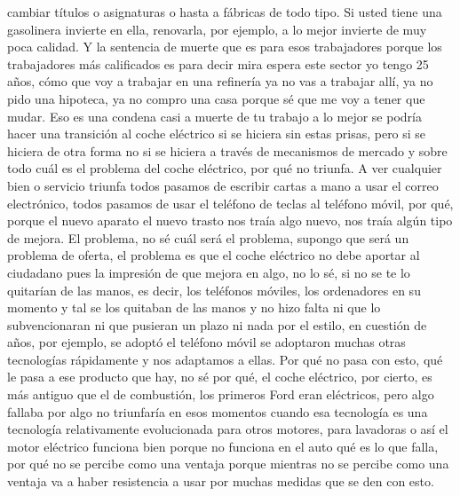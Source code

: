 cambiar títulos o asignaturas o hasta a fábricas de todo tipo. Si usted tiene una gasolinera invierte en ella, renovarla, por ejemplo, a lo mejor invierte de muy poca calidad. Y la sentencia de muerte que es para esos trabajadores porque los trabajadores más calificados es para decir mira espera este sector yo tengo 25 años, cómo que voy a trabajar en una refinería ya no vas a trabajar allí, ya no pido una hipoteca, ya no compro una casa porque sé que me voy a tener que mudar. Eso es una condena casi a muerte de tu trabajo a lo mejor se podría hacer una transición al coche eléctrico si se hiciera sin estas prisas, pero si se hiciera de otra forma no si se hiciera a través de mecanismos de mercado y sobre todo cuál es el problema del coche eléctrico, por qué no triunfa. A ver cualquier bien o servicio triunfa todos pasamos de escribir cartas a mano a usar el correo electrónico, todos pasamos de usar el teléfono de teclas al teléfono móvil, por qué, porque el nuevo aparato el nuevo trasto nos traía algo nuevo, nos traía algún tipo de mejora. El problema, no sé cuál será el problema, supongo que será un problema de oferta, el problema es que el coche eléctrico no debe aportar al ciudadano pues la impresión de que mejora en algo, no lo sé, si no se te lo quitarían de las manos, es decir, los teléfonos móviles, los ordenadores en su momento y tal se los quitaban de las manos y no hizo falta ni que lo subvencionaran ni que pusieran un plazo ni nada por el estilo, en cuestión de años, por ejemplo, se adoptó el teléfono móvil se adoptaron muchas otras tecnologías rápidamente y nos adaptamos a ellas. Por qué no pasa con esto, qué le pasa a ese producto que hay, no sé por qué, el coche eléctrico, por cierto, es más antiguo que el de combustión, los primeros Ford eran eléctricos, pero algo fallaba por algo no triunfaría en esos momentos cuando esa tecnología es una tecnología relativamente evolucionada para otros motores, para lavadoras o así el motor eléctrico funciona bien porque no funciona en el auto qué es lo que falla, por qué no se percibe como una ventaja porque mientras no se percibe como una ventaja va a haber resistencia a usar por muchas medidas que se den con esto.

